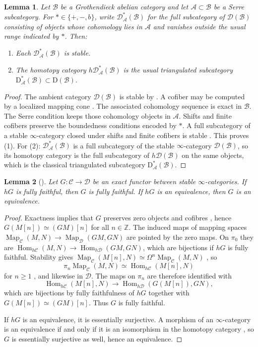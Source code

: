 \documentclass[11pt]{amsart}
\newcommand{\cA}{\mathcal{A}}
\newcommand{\cB}{\mathcal{B}}
\newcommand{\cC}{\mathcal{C}}
\newcommand{\cD}{\mathcal{D}}
\newcommand{\Hom}{\operatorname{Hom}}
\newcommand{\Map}{\operatorname{Map}}
\theoremstyle{plain}
\newtheorem{lemma}[lemma]{Lemma}
\theoremstyle{definition}
\numberwithin{equation}{section}
\begin{document}
\begin{lemma}\label{lem:bounded-serre}
Let $\cB$ be a Grothendieck abelian category and let $\cA\subset\cB$ be a Serre subcategory.
For $*\in\{+,-,b\}$, write $\mathcal D^*_{\cA}(\cB)$ for the full subcategory of $\cD(\cB)$ consisting of objects whose cohomology lies in $\cA$ and vanishes outside the usual range indicated by $*$.
Then:
\begin{enumerate}
\item
Each $\mathcal D^*_{\cA}(\cB)$ is stable.
\item
The homotopy category $h\mathcal D^*_{\cA}(\cB)$ is the usual triangulated subcategory $\mathrm D^*_{\cA}(\cB)\subset\mathrm D(\cB)$.
\end{enumerate}
\end{lemma}
\begin{proof}
The ambient category $\cD(\cB)$ is stable by .
A cofiber may be computed by a localized mapping cone \cite[Remark 1.3.2.17; Proposition 1.3.5.13]{HA}.
The associated cohomology sequence is exact in $\cB$.
The Serre condition keeps those cohomology objects in $\cA$.
Shifts and finite cofibers preserve the boundedness conditions encoded by $*$.
A full subcategory of a stable $\infty$-category closed under shifts and finite cofibers is stable \cite[Lemma 1.1.3.3]{HA}.
This proves (1).
For (2): $\mathcal D^*_{\cA}(\cB)$ is a full subcategory of the stable $\infty$-category $\cD(\cB)$, so its homotopy category is the full subcategory of $h\cD(\cB)$ on the same objects, which is the classical triangulated subcategory $\mathrm D^*_{\cA}(\cB)$.
\end{proof}


\begin{lemma}[{\cite[Proposition 5.10; Corollary 5.11]{BGT}}]\label{lem:exact-detection}
Let $G:\cC\to\cD$ be an exact functor between stable $\infty$-categories.
If $hG$ is fully faithful, then $G$ is fully faithful.
If $hG$ is an equivalence, then $G$ is an equivalence.
\end{lemma}
\begin{proof}
Exactness implies that $G$ preserves zero objects and cofibres \cite[Proposition 1.1.4.1]{HA}, hence $G(M[n])\simeq(GM)[n]$ for all $n\in\mathbb Z$.
The induced maps of mapping spaces $\Map_{\cC}(M,N)\to\Map_{\cD}(GM,GN)$ are pointed by the zero maps.
On $\pi_0$ they are $\Hom_{h\cC}(M,N)\to\Hom_{h\cD}(GM,GN)$, which are bijections if $hG$ is fully faithful.
Stability gives $\Map_{\cC}(M[n],N)\simeq\Omega^n\Map_{\cC}(M,N)$ \cite[Remark 1.1.2.8]{HA}, so
\[
 \pi_n\Map_{\cC}(M,N)\simeq\Hom_{h\cC}(M[n],N)
\]
for $n\ge 1$ \cite[Notation 1.1.2.17]{HA}, and likewise in $\cD$.
The maps on $\pi_n$ are therefore identified with
\[
 \Hom_{h\cC}(M[n],N)\longrightarrow\Hom_{h\cD}(G(M[n]),GN),
\]
which are bijections by fully faithfulness of $hG$ together with $G(M[n])\simeq(GM)[n]$.
Thus $G$ is fully faithful.

If $hG$ is an equivalence, it is essentially surjective.
A morphism of an $\infty$-category is an equivalence if and only if it is an isomorphism in the homotopy category \cite[\href{https://kerodon.net/tag/004Q}{Tag 004Q}]{Kerodon}, so $G$ is essentially surjective as well, hence an equivalence.
\end{proof}
\end{document}
